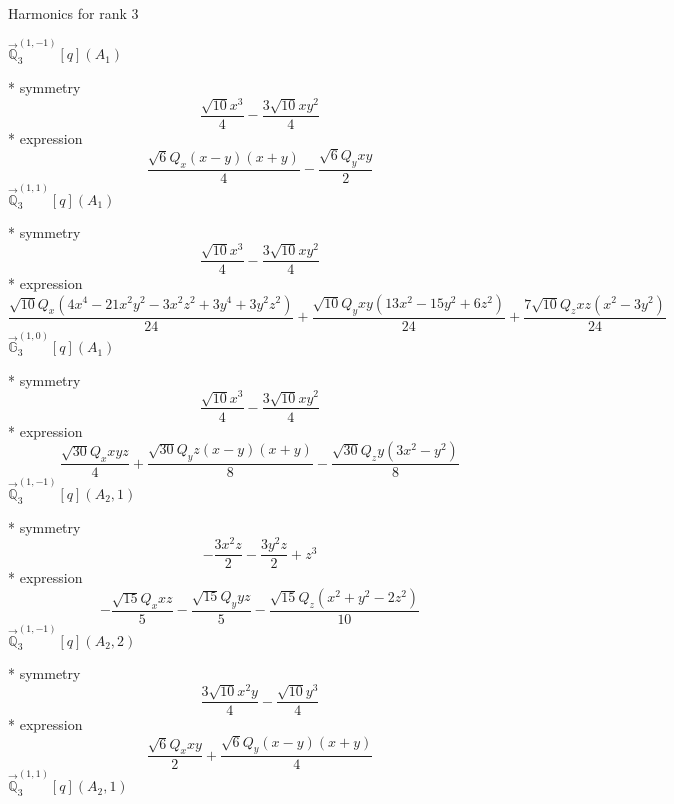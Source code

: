 \documentclass[fleqn,8pt]{jsarticle}
\begin{document}
\noindent * Harmonics for rank 3

\noindent\quad $\vec{\mathbb{Q}}_{3}^{(1,-1)}[q](A_{1})$

\noindent\quad ** symmetry
\begin{dmath*}
\frac{\sqrt{10} x^{3}}{4} - \frac{3 \sqrt{10} x y^{2}}{4}
\end{dmath*}
\noindent\quad ** expression
\begin{dmath*}
\frac{\sqrt{6} Q_{x} \left(x - y\right) \left(x + y\right)}{4} - \frac{\sqrt{6} Q_{y} x y}{2}
\end{dmath*}
\noindent\quad $\vec{\mathbb{Q}}_{3}^{(1,1)}[q](A_{1})$

\noindent\quad ** symmetry
\begin{dmath*}
\frac{\sqrt{10} x^{3}}{4} - \frac{3 \sqrt{10} x y^{2}}{4}
\end{dmath*}
\noindent\quad ** expression
\begin{dmath*}
\frac{\sqrt{10} Q_{x} \left(4 x^{4} - 21 x^{2} y^{2} - 3 x^{2} z^{2} + 3 y^{4} + 3 y^{2} z^{2}\right)}{24} + \frac{\sqrt{10} Q_{y} x y \left(13 x^{2} - 15 y^{2} + 6 z^{2}\right)}{24} + \frac{7 \sqrt{10} Q_{z} x z \left(x^{2} - 3 y^{2}\right)}{24}
\end{dmath*}
\noindent\quad $\vec{\mathbb{G}}_{3}^{(1,0)}[q](A_{1})$

\noindent\quad ** symmetry
\begin{dmath*}
\frac{\sqrt{10} x^{3}}{4} - \frac{3 \sqrt{10} x y^{2}}{4}
\end{dmath*}
\noindent\quad ** expression
\begin{dmath*}
\frac{\sqrt{30} Q_{x} x y z}{4} + \frac{\sqrt{30} Q_{y} z \left(x - y\right) \left(x + y\right)}{8} - \frac{\sqrt{30} Q_{z} y \left(3 x^{2} - y^{2}\right)}{8}
\end{dmath*}
\noindent\quad $\vec{\mathbb{Q}}_{3}^{(1,-1)}[q](A_{2},1)$

\noindent\quad ** symmetry
\begin{dmath*}
- \frac{3 x^{2} z}{2} - \frac{3 y^{2} z}{2} + z^{3}
\end{dmath*}
\noindent\quad ** expression
\begin{dmath*}
- \frac{\sqrt{15} Q_{x} x z}{5} - \frac{\sqrt{15} Q_{y} y z}{5} - \frac{\sqrt{15} Q_{z} \left(x^{2} + y^{2} - 2 z^{2}\right)}{10}
\end{dmath*}
\noindent\quad $\vec{\mathbb{Q}}_{3}^{(1,-1)}[q](A_{2},2)$

\noindent\quad ** symmetry
\begin{dmath*}
\frac{3 \sqrt{10} x^{2} y}{4} - \frac{\sqrt{10} y^{3}}{4}
\end{dmath*}
\noindent\quad ** expression
\begin{dmath*}
\frac{\sqrt{6} Q_{x} x y}{2} + \frac{\sqrt{6} Q_{y} \left(x - y\right) \left(x + y\right)}{4}
\end{dmath*}
\noindent\quad $\vec{\mathbb{Q}}_{3}^{(1,1)}[q](A_{2},1)$
\end{document}
